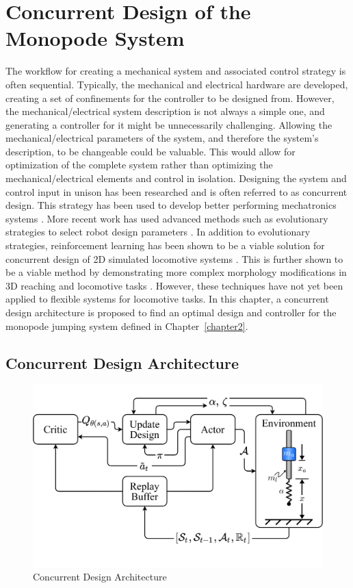 \chapter{Concurrent Design of the Monopode System}
\label{chapter5}

The workflow for creating a mechanical system and associated control strategy is often sequential. Typically, the mechanical and electrical hardware are developed, creating a set of confinements for the controller to be designed from. However, the mechanical/electrical system description is not always a simple one, and generating a controller for it might be unnecessarily challenging. Allowing the mechanical/electrical parameters of the system, and therefore the system's description, to be changeable could be valuable. This would allow for optimization of the complete system rather than optimizing the mechanical/electrical elements and control in isolation. Designing the system and control input in unison has been researched and is often referred to as concurrent design. This strategy has been used to develop better performing mechatronics systems \cite{Li2001}. More recent work has used advanced methods such as evolutionary strategies to select robot design parameters \cite{Wang2019}. In addition to evolutionary strategies, reinforcement learning has been shown to be a viable solution for concurrent design of 2D simulated locomotive systems \cite{Ha2019j}. This is further shown to be a viable method by demonstrating more complex morphology modifications in 3D reaching and locomotive tasks \cite{Schaff2019e}. However, these techniques have not yet been applied to flexible systems for locomotive tasks. In this chapter, a concurrent design architecture is proposed to find an optimal design and controller for the monopode jumping system defined in Chapter~\ref{chapter2}. 
\section{Concurrent Design Architecture}
\label{sec:concurrent_des_arch}
% 
\begin{figure}[tb!]
  \centering
  \includegraphics[width=\textwidth]{figures/Ch5/conc_des_diagram.drawio.png}  
  \caption{Concurrent Design Architecture}
  \label{fig:conc_des_diagram}
\end{figure}
% 


